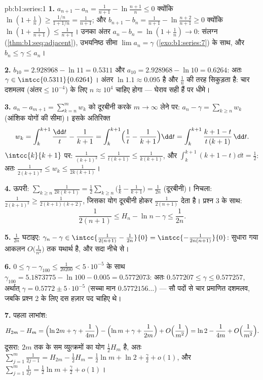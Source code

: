 \begin{solution}{pb:b1:series:1}
\textbf{1.} $a_{n+1} - a_n = \frac{1}{n+1} - \ln\frac{n+1}{n} \leq 0$
क्योंकि $\ln(1 + \frac1n) \geq \frac{1/n}{1 + 1/n} = \frac{1}{n+1}$; और
$b_{n+1} - b_n = \frac{1}{n+1} - \ln\frac{n+2}{n+1} \geq 0$ क्योंकि $\ln(1 +
\frac{1}{n+1}) \leq \frac{1}{n+1}$। उनका अंतर $a_n - b_n = \ln(1 + \frac1n)
\to 0$: संलग्न (\cref{thm:b1:seq:adjacent}), उभयनिष्ठ सीमा $\lim a_n =
\gamma$ (\cref{exo:b1:series:7}) के साथ, और $b_n \leq \gamma \leq a_n$।

\textbf{2.} $b_{10} = 2.928968 - \ln 11 = 0.5311$ और $a_{10} = 2.928968 -
\ln 10 = 0.6264$: अतः $\gamma \in \intcc{0.5311}{0.6264}$। अंतर $\ln 1.1
\approx 0.095$ है और $\frac1n$ की तरह सिकुड़ता है: चार दशमलव ($\text{अंतर}
\leq 10^{-4}$) के लिए $n \approx 10^4$ चाहिए होगा --- घेराव सही हैं पर धीमे।

\textbf{3.} $a_n - a_{m+1} = \sum_{k=n}^{m} w_k$ को दूरबीनी करके $m \to
\infty$ लेने पर: $a_n - \gamma = \sum_{k\geq n} w_k$ (आंशिक योगों की सीमा)।
इसके अतिरिक्त
\[
w_k = \int_k^{k+1} \frac{\dd t}{t} - \frac{1}{k+1}
= \int_k^{k+1} \Bigl(\frac1t - \frac{1}{k+1}\Bigr)\dd t
= \int_k^{k+1} \frac{k + 1 - t}{t\,(k+1)}\,\dd t .
\]
$\intcc{k}{k+1}$ पर: $\frac{1}{(k+1)^2} \leq \frac{1}{t(k+1)} \leq
\frac{1}{k(k+1)}$, और $\int_k^{k+1}(k + 1 - t)\dd t = \frac12$: अतः
$\frac{1}{2(k+1)^2} \leq w_k \leq \frac{1}{2k(k+1)}$।

\textbf{4.} ऊपरी: $\sum_{k \geq n} \frac{1}{2k(k+1)} = \frac12\sum_{k\geq
n}\bigl(\frac1k - \frac{1}{k+1}\bigr) = \frac{1}{2n}$ (दूरबीनी)। निचला:
$\frac{1}{2(k+1)^2} \geq \frac{1}{2(k+1)(k+2)}$, जिसका योग दूरबीनी होकर
$\frac{1}{2(n+1)}$ देता है। प्रश्न 3 के साथ:
\[
\frac{1}{2(n+1)} \leq H_n - \ln n - \gamma \leq \frac{1}{2n} .
\]

\textbf{5.} $\frac{1}{2n}$ घटाइए: $\gamma_n - \gamma \in
\intcc{\frac{1}{2(n+1)} - \frac{1}{2n}}{0} = \intcc{-\frac{1}{2n(n+1)}}{0}$:
सुधारा गया आकलन $O\bigl(\frac{1}{n^2}\bigr)$ तक यथार्थ है, और सदा नीचे से।

\textbf{6.} $0 \leq \gamma - \gamma_{100} \leq \frac{1}{20200} <
5\cdot10^{-5}$ के साथ $\gamma_{100} = 5.1873775 - \ln 100 - 0.005 =
0.5772073$: अतः $0.577207 \leq \gamma \leq 0.577257$, अर्थात् $\gamma =
0.5772 \pm 5\cdot10^{-5}$ (सच्चा मान $0.5772156\dots$) --- सौ पदों से चार
प्रमाणित दशमलव, जबकि प्रश्न 2 के लिए दस हज़ार पद चाहिए थे।

\textbf{7.} पहला लाभांश:
\[
H_{2m} - H_m = \Bigl(\ln 2m + \gamma + \frac{1}{4m}\Bigr)
- \Bigl(\ln m + \gamma + \frac{1}{2m}\Bigr) +
O\Bigl(\frac{1}{m^2}\Bigr)
= \ln 2 - \frac{1}{4m} + O\Bigl(\frac{1}{m^2}\Bigr).
\]
दूसरा: $2m$ तक के सम व्युत्क्रमों का योग $\frac12 H_m$ है, अतः
$\sum_{j=1}^{m}\frac{1}{2j-1} = H_{2m} - \frac12 H_m = \frac12 \ln m + \ln 2
+ \frac\gamma2 + o(1)$, और $\sum_{j=1}^m \frac{1}{2j} = \frac12\ln m +
\frac\gamma2 + o(1)$।


\end{solution}
